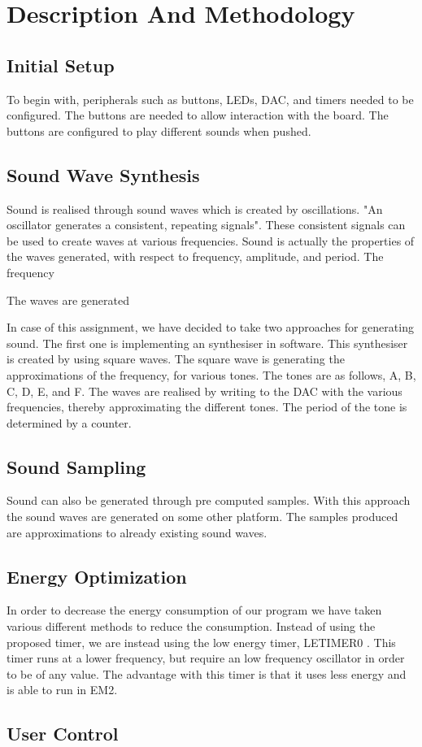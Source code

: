 \section{Description And Methodology}


\subsection{Initial Setup}
To begin with, peripherals such as buttons, LEDs, DAC, and timers needed to be configured. The buttons are needed to allow interaction with the board. The buttons are configured to play different sounds when pushed. 


\subsection{Sound Wave Synthesis}
Sound is realised through sound waves which is created by oscillations. "An oscillator generates a consistent, repeating signals". These consistent signals can be used to create waves at various frequencies. Sound is actually the properties of the waves generated, with respect to frequency, amplitude, and period. The frequency 

The waves are generated  


In case of this assignment, we have decided to take two approaches for generating sound. The first one is implementing an synthesiser in software. This synthesiser is created by using square waves. The square wave is generating the approximations of the frequency, for various tones. The tones are as follows, A, B, C, D, E, and F. The waves are realised by writing to the DAC with the various frequencies, thereby approximating the different tones. The period of the tone is determined by a counter.

  


\subsection{Sound Sampling}
Sound can also be generated through pre computed samples. With this approach the sound waves are generated on some other platform. The samples produced are approximations to already existing sound waves.


\subsection{Energy Optimization}
In order to decrease the energy consumption of our program we have taken various different methods to reduce the consumption. Instead of using the proposed timer\cite{compendium}, we are instead using the low energy timer, LETIMER0 \cite{EFM32GG-rm}. This timer runs at a lower frequency, but require an low frequency oscillator in order to be of any value. The advantage with this timer is that it uses less energy and is able to run in EM2.  



\subsection{User Control}













